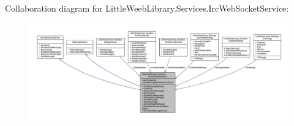 Collaboration diagram for Little\+Weeb\+Library.\+Services.\+Irc\+Web\+Socket\+Service\+:\nopagebreak
\begin{figure}[H]
\begin{center}
\leavevmode
\includegraphics[width=350pt]{class_little_weeb_library_1_1_services_1_1_irc_web_socket_service__coll__graph}
\end{center}
\end{figure}
